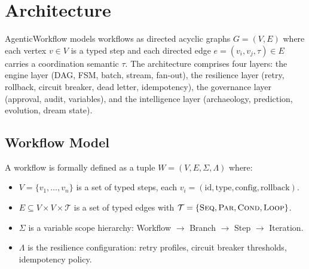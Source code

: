 \documentclass[10pt, twocolumn]{article}
\begin{document}
\section{Architecture}\label{sec:architecture}

AgenticWorkflow models workflows as directed acyclic graphs $G = (V, E)$ where each vertex $v \in V$ is a typed step and each directed edge $e = (v_i, v_j, \tau) \in E$ carries a coordination semantic $\tau$. The architecture comprises four layers: the engine layer (DAG, FSM, batch, stream, fan-out), the resilience layer (retry, rollback, circuit breaker, dead letter, idempotency), the governance layer (approval, audit, variables), and the intelligence layer (archaeology, prediction, evolution, dream state).

\subsection{Workflow Model}\label{sec:model}

A workflow is formally defined as a tuple $W = (V, E, \Sigma, \Lambda)$ where:
\begin{itemize}[nosep, leftmargin=*]
  \item $V = \{v_1, \ldots, v_n\}$ is a set of typed steps, each $v_i = (\text{id}, \text{type}, \text{config}, \text{rollback})$.
  \item $E \subseteq V \times V \times \mathcal{T}$ is a set of typed edges with $\mathcal{T} = \{\textsc{Seq}, \textsc{Par}, \textsc{Cond}, \textsc{Loop}\}$.
  \item $\Sigma$ is a variable scope hierarchy: Workflow $\to$ Branch $\to$ Step $\to$ Iteration.
  \item $\Lambda$ is the resilience configuration: retry profiles, circuit breaker thresholds, idempotency policy.
\end{itemize}
\end{document}
